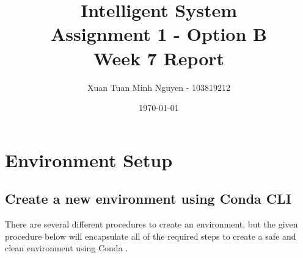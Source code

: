 \documentclass[11pt]{article}
\title{Intelligent System \\ Assignment 1 - Option B \\ Week 7 Report}
\author{Xuan Tuan Minh Nguyen - 103819212}
\date{\today}
\begin{document}
\maketitle
\pagebreak

\tableofcontents

\newpage

\section{Environment Setup}
\subsection{Create a new environment using Conda CLI}
There are several different procedures to create an environment, but the given procedure below will encapsulate all of the required steps to create a safe and clean environment using Conda \citep{Haque2023-kt}.

\end{document}
